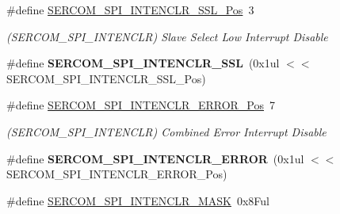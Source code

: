 \begin{DoxyCompactItemize}
\item 
\hypertarget{group___s_a_m_l21___s_e_r_c_o_m_gacadf12f1254b83d20ffe08850df336e0}{}\#define \hyperlink{group___s_a_m_l21___s_e_r_c_o_m_gacadf12f1254b83d20ffe08850df336e0}{S\+E\+R\+C\+O\+M\+\_\+\+S\+P\+I\+\_\+\+I\+N\+T\+E\+N\+C\+L\+R\+\_\+\+S\+S\+L\+\_\+\+Pos}~3\label{group___s_a_m_l21___s_e_r_c_o_m_gacadf12f1254b83d20ffe08850df336e0}

\begin{DoxyCompactList}\small\item\em (S\+E\+R\+C\+O\+M\+\_\+\+S\+P\+I\+\_\+\+I\+N\+T\+E\+N\+C\+L\+R) Slave Select Low Interrupt Disable \end{DoxyCompactList}\item 
\hypertarget{group___s_a_m_l21___s_e_r_c_o_m_ga8df0127d4553801510a330d6a6c06023}{}\#define {\bfseries S\+E\+R\+C\+O\+M\+\_\+\+S\+P\+I\+\_\+\+I\+N\+T\+E\+N\+C\+L\+R\+\_\+\+S\+S\+L}~(0x1ul $<$$<$ S\+E\+R\+C\+O\+M\+\_\+\+S\+P\+I\+\_\+\+I\+N\+T\+E\+N\+C\+L\+R\+\_\+\+S\+S\+L\+\_\+\+Pos)\label{group___s_a_m_l21___s_e_r_c_o_m_ga8df0127d4553801510a330d6a6c06023}

\item 
\hypertarget{group___s_a_m_l21___s_e_r_c_o_m_ga67c425c1cd551259d9bc04b4f2510321}{}\#define \hyperlink{group___s_a_m_l21___s_e_r_c_o_m_ga67c425c1cd551259d9bc04b4f2510321}{S\+E\+R\+C\+O\+M\+\_\+\+S\+P\+I\+\_\+\+I\+N\+T\+E\+N\+C\+L\+R\+\_\+\+E\+R\+R\+O\+R\+\_\+\+Pos}~7\label{group___s_a_m_l21___s_e_r_c_o_m_ga67c425c1cd551259d9bc04b4f2510321}

\begin{DoxyCompactList}\small\item\em (S\+E\+R\+C\+O\+M\+\_\+\+S\+P\+I\+\_\+\+I\+N\+T\+E\+N\+C\+L\+R) Combined Error Interrupt Disable \end{DoxyCompactList}\item 
\hypertarget{group___s_a_m_l21___s_e_r_c_o_m_ga2bec344dac908bb08fcf8c988a1ee235}{}\#define {\bfseries S\+E\+R\+C\+O\+M\+\_\+\+S\+P\+I\+\_\+\+I\+N\+T\+E\+N\+C\+L\+R\+\_\+\+E\+R\+R\+O\+R}~(0x1ul $<$$<$ S\+E\+R\+C\+O\+M\+\_\+\+S\+P\+I\+\_\+\+I\+N\+T\+E\+N\+C\+L\+R\+\_\+\+E\+R\+R\+O\+R\+\_\+\+Pos)\label{group___s_a_m_l21___s_e_r_c_o_m_ga2bec344dac908bb08fcf8c988a1ee235}

\item 
\hypertarget{group___s_a_m_l21___s_e_r_c_o_m_ga86471fcf42db9e017280002f28b2e8cc}{}\#define \hyperlink{group___s_a_m_l21___s_e_r_c_o_m_ga86471fcf42db9e017280002f28b2e8cc}{S\+E\+R\+C\+O\+M\+\_\+\+S\+P\+I\+\_\+\+I\+N\+T\+E\+N\+C\+L\+R\+\_\+\+M\+A\+S\+K}~0x8\+Ful\label{group___s_a_m_l21___s_e_r_c_o_m_ga86471fcf42db9e017280002f28b2e8cc}


\end{DoxyCompactItemize}
